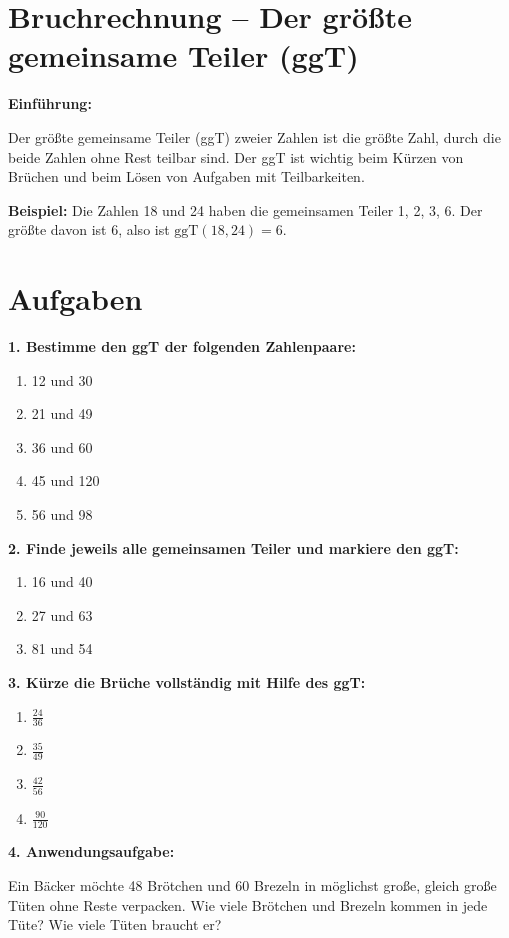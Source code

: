 \section*{Bruchrechnung – Der größte gemeinsame Teiler (ggT)}

\textbf{Einführung:}

Der größte gemeinsame Teiler (ggT) zweier Zahlen ist die größte Zahl, durch die beide Zahlen ohne Rest teilbar sind. Der ggT ist wichtig beim Kürzen von Brüchen und beim Lösen von Aufgaben mit Teilbarkeiten.

\textbf{Beispiel:} Die Zahlen 18 und 24 haben die gemeinsamen Teiler 1, 2, 3, 6. Der größte davon ist 6, also ist $\mathrm{ggT}(18,24) = 6$.

\vspace{1em}

\section*{Aufgaben}

\textbf{1. Bestimme den ggT der folgenden Zahlenpaare:}
\begin{enumerate}[label=\alph*)]
  \item 12 und 30
  \item 21 und 49
  \item 36 und 60
  \item 45 und 120
  \item 56 und 98
\end{enumerate}

\textbf{2. Finde jeweils alle gemeinsamen Teiler und markiere den ggT:}
\begin{enumerate}[label=\alph*)]
  \item 16 und 40
  \item 27 und 63
  \item 81 und 54
\end{enumerate}

\textbf{3. Kürze die Brüche vollständig mit Hilfe des ggT:}
\begin{enumerate}[label=\alph*)]
  \item $\displaystyle{\frac{24}{36}}$
  \item $\displaystyle{\frac{35}{49}}$
  \item $\displaystyle{\frac{42}{56}}$
  \item $\displaystyle{\frac{90}{120}}$
\end{enumerate}
\newpage
\textbf{4. Anwendungsaufgabe:}

Ein Bäcker möchte 48 Brötchen und 60 Brezeln in möglichst große, gleich große Tüten ohne Reste verpacken. Wie viele Brötchen und Brezeln kommen in jede Tüte? Wie viele Tüten braucht er?